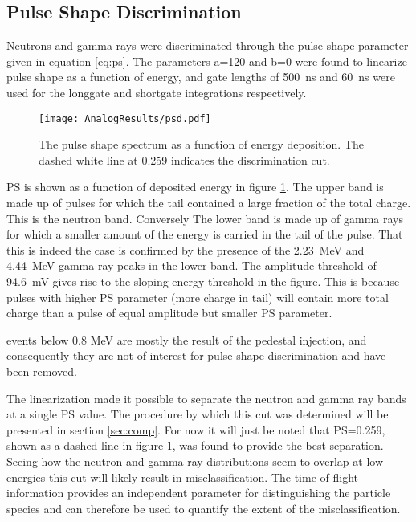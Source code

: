 \documentclass[main.tex]{subfiles}
\begin{document}
\subsection{Pulse Shape Discrimination}
Neutrons and gamma rays were discriminated through the pulse shape parameter given in equation \ref{eq:ps}. The parameters a=120 and b=0 were found to linearize pulse shape as a function of energy, and gate lengths of \SI{500}{\ns} and \SI{60}{ns} were used for the longgate and shortgate integrations respectively.

\begin{figure}[ht]
    \centering
        \texttt{[image: AnalogResults/psd.pdf]}
        \caption[PSD spectrum, analog setup.]{The pulse shape spectrum as a function of energy deposition. The dashed white line at 0.259 indicates the discrimination cut.}
        \label{fig:psd_a}
\end{figure}

PS is shown as a function of deposited energy in figure \ref{fig:psd_a}. The upper band is made up of pulses for which the tail contained a large fraction of the total charge. This is the neutron band. Conversely The lower band is made up of gamma rays for which a smaller amount of the energy is carried in the tail of the pulse. That this is indeed the case is confirmed by the presence of the \SI{2.23}{MeV} and \SI{4.44}{MeV} gamma ray peaks in the lower band. The amplitude threshold of \SI{94.6}{mV} gives rise to the sloping energy threshold in the figure. This is because pulses with higher PS parameter (more charge in tail) will contain more total charge than a pulse of equal amplitude but smaller PS parameter.


events below 0.8 MeV are mostly the result of the pedestal injection, and consequently they are not of interest for pulse shape discrimination and have been removed.

The linearization made it possible to separate the neutron and gamma ray bands at a single PS value. The procedure by which this cut was determined will be presented in section \ref{sec:comp}. For now it will just be noted that PS=0.259, shown as a dashed line in figure \ref{fig:psd_a}, was found to provide the best separation. Seeing how the neutron and gamma ray distributions seem to overlap at low energies this cut will likely result in misclassification. The time of flight information provides an independent parameter for distinguishing the particle species and can therefore be used to quantify the extent of the misclassification.
\end{document}
